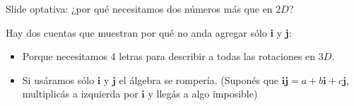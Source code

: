 \documentclass[10pt]{beamer}
\def\R{\mathbb{R}}
\def\ii{\textbf{i}}
\def\jj{\textbf{j}}
\begin{document}
\begin{frame}{Slide optativa: ¿por qué necesitamos dos números más que en $2D$?}

\large Hay dos cuentas que muestran por qué no anda agregar sólo \textbf{\ii} y \textbf{\jj}:

\normalsize

\begin{itemize}
    \item Porque necesitamos 4 letras para describir a todas las rotaciones en $3D$. \pause
    \item Si usáramos sólo $\ii$ y $\jj$ el álgebra se rompería. (Suponés que $\ii\jj=a+b\ii+c\jj$, multiplicás a izquierda por $\ii$ y llegás a algo imposible)
\end{itemize}

\end{frame}
\end{document}
